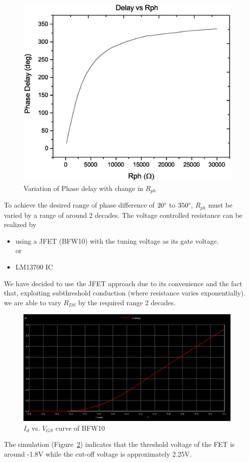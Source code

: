 \documentclass[]{risa}
\begin{document}
\begin{figure}[H]
    \centering
    \includegraphics[width=\columnwidth]{Delay_vs_Rph.eps}
    \caption{Variation of Phase delay with change in $R_{ph}$}
    \label{fig:delay_vs_Rph}
\end{figure}

To achieve the desired range of phase difference of $20\degree$ to $350\degree$, $R_{ph}$ must be varied by a range of around 2 decades.
The voltage controlled resistance can be realized by
\begin{itemize}
    \item using a JFET (BFW10) with the tuning voltage as its gate voltage.\\
    or
    \item LM13700 IC
\end{itemize}

We have decided to use the JFET approach due to its convenience and the fact that, exploiting subthreshold conduction (where resistance varies exponentially). we are able to vary $R_{DS}$ by the required range 2 decades.

\begin{figure}[bhp]
    \centering
    \includegraphics[width=\columnwidth]{GIT_Id_vs_Vgs.PNG}
    \caption{$I_d$ vs. $V_{GS}$ curve of BFW10}
    \label{fig:Id_Vgs}
\end{figure}
The simulation (Figure~\ref{fig:Id_Vgs}) indicates that the threshold voltage of the FET is around -1.8V while the cut-off voltage is approximately 2.25V.
\end{document}

